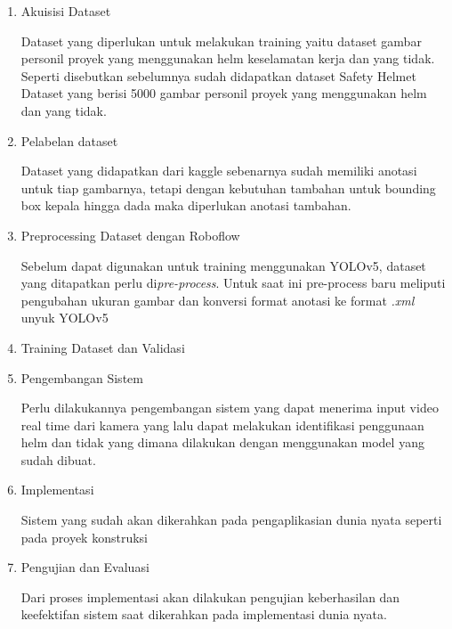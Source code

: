 \begin{enumerate}
  \item Akuisisi Dataset
  \par Dataset yang diperlukan untuk melakukan training yaitu dataset gambar personil proyek yang menggunakan helm keselamatan kerja dan yang tidak. Seperti disebutkan sebelumnya sudah didapatkan dataset Safety Helmet Dataset yang berisi 5000 gambar personil proyek yang menggunakan helm dan yang tidak.
  
  \item Pelabelan dataset
  \par Dataset yang didapatkan dari kaggle sebenarnya sudah memiliki anotasi untuk tiap gambarnya, tetapi dengan kebutuhan tambahan untuk bounding box kepala hingga dada maka diperlukan anotasi tambahan.
  
  \item Preprocessing Dataset dengan Roboflow
  \par Sebelum dapat digunakan untuk training menggunakan YOLOv5, dataset yang ditapatkan perlu di\emph{pre-process}. Untuk saat ini pre-process baru meliputi pengubahan ukuran gambar dan konversi format anotasi ke format \emph{.xml} unyuk YOLOv5

  \item Training Dataset dan Validasi

  \item Pengembangan Sistem
  \par Perlu dilakukannya pengembangan sistem yang dapat menerima input video real time dari kamera yang lalu dapat melakukan identifikasi penggunaan helm dan tidak yang dimana dilakukan dengan menggunakan model yang sudah dibuat. 

  \item Implementasi
  \par Sistem yang sudah akan dikerahkan pada pengaplikasian dunia nyata seperti pada proyek konstruksi

  \item Pengujian dan Evaluasi
  \par Dari proses implementasi akan dilakukan pengujian keberhasilan dan keefektifan sistem saat dikerahkan pada implementasi dunia nyata.

\end{enumerate}





% 


